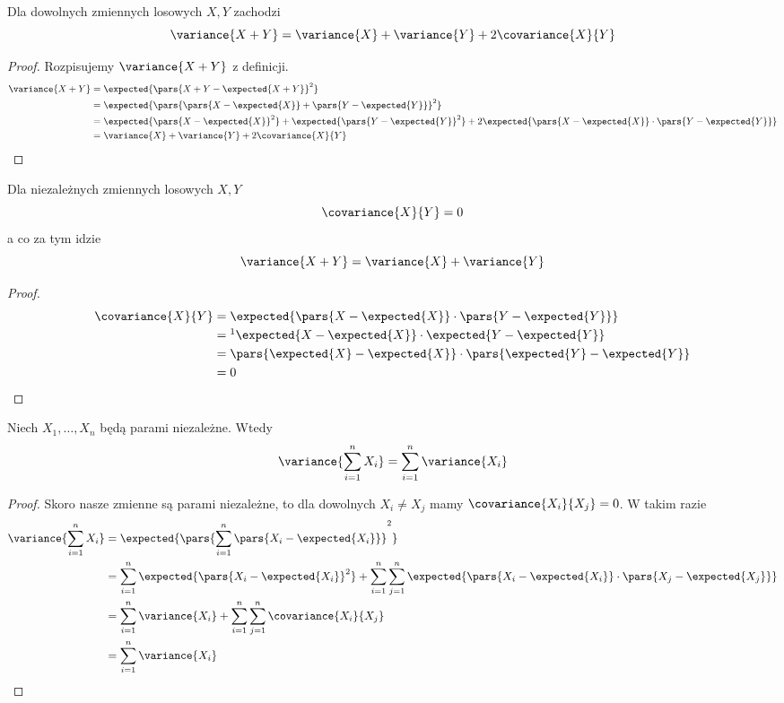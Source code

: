 \begin{theorem}
	Dla dowolnych zmiennych losowych \( X, Y \) zachodzi
	\[
		\variance{X + Y} = \variance{X} + \variance{Y} + 2\covariance{X}{Y}
	\]
\end{theorem}
\begin{proof}
	Rozpisujemy \( \variance{X + Y} \) z definicji.
	\begin{align*}
		\variance{X + Y}
		 & = \expected{\pars{X + Y - \expected{X + Y}}^2}                                \\
		 & = \expected{\pars{\pars{X - \expected{X}} + \pars{Y - \expected{Y}}}^2}       \\
		 & = \expected{\pars{X - \expected{X}}^2} + \expected{\pars{Y - \expected{Y}}^2}
		+ 2\expected{\pars{X - \expected{X}}\cdot\pars{Y - \expected{Y}}}                \\
		 & = \variance{X} + \variance{Y} + 2\covariance{X}{Y}
	\end{align*}
\end{proof}

\begin{theorem} Dla niezależnych zmiennych losowych \( X, Y \)
	\[
		\covariance{X}{Y} = 0
	\]
	a co za tym idzie
	\[
		\variance{X + Y} = \variance{X} + \variance{Y}
	\]
\end{theorem}
\begin{proof}
	\begin{align*}
		\covariance{X}{Y}
		 & = \expected{\pars{X - \expected{X}} \cdot \pars{Y - \expected{Y}}}            \\
		 & =\footnotemark \expected{X - \expected{X}} \cdot \expected{Y - \expected{Y}}               \\
		 & = \pars{\expected{X} - \expected{X}} \cdot \pars{\expected{Y} - \expected{Y}} \\
		 & = 0
	\end{align*}
\end{proof}

\begin{theorem}
	\label{variance-of-sum-of-independent-variables}
	Niech \( X_1, \dots, X_n \) będą parami niezależne. Wtedy
	\[
		\variance{\sum_{i=1}^n X_i} = \sum_{i=1}^n \variance{X_i}
	\]
\end{theorem}
\begin{proof}
	Skoro nasze zmienne są parami niezależne, to dla dowolnych \( X_i \neq X_j \) mamy \( \covariance{X_i}{X_j} = 0 \). W takim razie
	\begin{align*}
		\variance{\sum_{i=1}^n X_i}
		 & = \expected{\pars{\sum_{i=1}^n \pars{X_i - \expected{X_i}}}^2}                                  \\
		 & = \sum_{i=1}^n \expected{\pars{X_i - \expected{X_i}}^2}
		+ \sum_{i=1}^n \sum_{j=1}^n \expected{\pars{X_i - \expected{X_i}}\cdot\pars{X_j - \expected{X_j}}} \\
		 & = \sum_{i=1}^n \variance{X_i} + \sum_{i=1}^n \sum_{j=1}^n \covariance{X_i}{X_j}                 \\
		 & = \sum_{i=1}^n \variance{X_i}
	\end{align*}
\end{proof}

